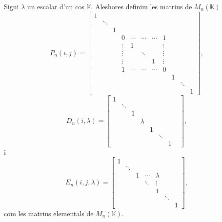 \documentclass[../Apunts.tex]{subfiles}
\begin{document}
	\begin{definition}
		\label{def:matrius elementals}
		Sigui \(\lambda\) un escalar d'un cos \(\mathbb{K}\). Aleshores definim les matrius de \(M_{n}(\mathbb{K})\)
		\[P_{n}(i,j)=\left[\begin{matrix}
		1 & & & & & & & & & & \\
		& \ddots & & & & & & & & & \\
		& & 1 & & & & & & & & \\
		& & & 0 & \cdots & \cdots & \cdots & 1 & & & \\
		& & & \vdots & 1 & & & \vdots & & & \\
		& & & \vdots & & \ddots & & \vdots & & & \\
		& & & \vdots & & & 1 & \vdots & & & \\
		& & & 1 & \cdots & \cdots & \cdots & 0 & & & \\
		& & & & & & & & 1 & & \\
		& & & & & & & & & \ddots & \\
		& & & & & & & & & & 1
		\end{matrix}\right],\]
		\[D_{n}(i,\lambda)=\left[\begin{matrix}
		1 & & & & & & & \\
		& \ddots & & & & & \\
		& & 1 & & & & \\
		& & & \lambda & & & \\
		& & & & 1 & & \\
		& & & & & \ddots & \\
		& & & & & & 1
		\end{matrix}\right],\]
		i
		\[E_{n}(i,j,\lambda)=\left[\begin{matrix}
		1 & & & & & & \\
		& \ddots & & & & & \\
		& & 1 & \cdots & \lambda & & \\
		& & & \ddots & \vdots & \\
		& & & & 1 & & \\
		& & & & & \ddots & \\
		& & & & & & 1
		\end{matrix}\right],\]
		com les matrius elementals de \(M_{n}(\mathbb{K})\).
	\end{definition}
	
\end{document}

